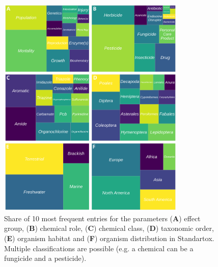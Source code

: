 \documentclass[journal,datadescriptor,submit,moreauthors,pdftex]{Definitions/mdpi}
\begin{document}
\begin{figure}[H]
    \centering
    \includegraphics[width=0.8\textwidth]{article/figures/standartox_parameters.png}
    \caption{Share of 10 most frequent entries for the parameters (\textbf{A}) effect group, (\textbf{B}) chemical role, (\textbf{C}) chemical class, (\textbf{D}) taxonomic order, (\textbf{E}) organism habitat and (\textbf{F}) organism distribution in Standartox. Multiple classifications are possible (e.g. a chemical can be a fungicide and a pesticide).}
    \label{fig:stx-parameters}
\end{figure}
\end{document}

